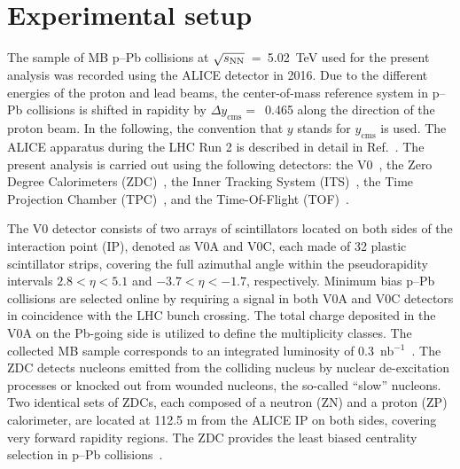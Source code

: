 \section{Experimental setup}
\label{sec:setup}
The sample of MB p--Pb collisions at $\sqrt{s_{\rm NN}}$~=~5.02~TeV used for the present analysis was recorded using the ALICE detector in 2016. Due to the different energies of the proton and lead beams, the center-of-mass reference system in p--Pb collisions is shifted in rapidity by $\Delta y_{\mathrm{cms}} =$~0.465 along the direction of the proton beam. In the following, the convention that $y$ stands for $y_{\mathrm{cms}}$ is used. The ALICE apparatus during the LHC Run 2 is described in detail in Ref.~\cite{Abelev:2014ffa}. The present analysis is carried out using the following detectors: the V0~\cite{ALICE:2013axi}, the Zero Degree Calorimeters (ZDC)~\cite{Cortese:2019nnv}, the Inner Tracking System (ITS)~\cite{ALICE:2010tia}, the Time Projection Chamber (TPC)~\cite{Alme:2010ke}, and the Time-Of-Flight (TOF)~\cite{Jacazio:2018slq}. 

The V0 detector consists of two arrays of scintillators located on both sides of the interaction point (IP), denoted as V0A and V0C, each made of 32 plastic scintillator strips, covering the full azimuthal angle within the pseudorapidity intervals $2.8 < \eta < 5.1$ and $-3.7 < \eta < -1.7$, respectively. Minimum bias p--Pb collisions are selected online by requiring a signal in both V0A and V0C detectors in coincidence with the LHC bunch crossing. The total charge deposited in the V0A on the Pb-going side is utilized to define the multiplicity classes. The collected MB sample corresponds to an integrated luminosity of 0.3~nb$^{-1}$~\cite{ALICE:2014gvw}. The ZDC detects nucleons emitted from the colliding nucleus by nuclear de-excitation processes or knocked out from wounded nucleons, the so-called “slow” nucleons. Two identical sets of ZDCs, each composed of a neutron (ZN) and a proton (ZP) calorimeter, are located at 112.5 m from the ALICE IP on both sides, covering very forward rapidity regions. The ZDC provides the least biased centrality selection in p--Pb collisions~\cite{ALICE:2014xsp}.
 
